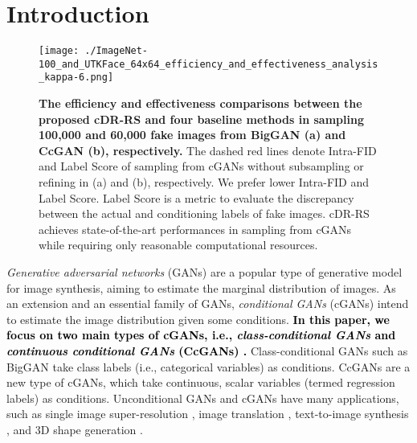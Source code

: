 \documentclass[final,12pt, 3p,times]{elsarticle}
\def\rev#1{\textcolor{black}{#1}}
\begin{document}
\section{Introduction}\label{sec:intro}

\begin{figure}[ht]
	\centering
	\texttt{[image: ./ImageNet-100\_and\_UTKFace\_64x64\_efficiency\_and\_effectiveness\_analysis\_kappa-6.png]}
	\caption{\textbf{The efficiency and effectiveness comparisons between the proposed cDR-RS and four baseline methods in sampling 100,000 and 60,000 fake images from BigGAN \cite{brock2018large} (a) and CcGAN \cite{ding2021ccgan, ding2020continuous} (b), respectively.} The dashed red lines denote Intra-FID \cite{miyato2018cgans} and Label Score \cite{ding2021ccgan, ding2020continuous} of sampling from cGANs without subsampling or refining in (a) and (b), respectively. We prefer lower Intra-FID and Label Score. Label Score is a metric to evaluate the discrepancy between the actual and conditioning labels of fake images. cDR-RS achieves state-of-the-art performances in sampling from cGANs while requiring only reasonable computational resources.}
	\label{fig:cover_fig}
\end{figure}



\textit{Generative adversarial networks} (GANs) \cite{goodfellow2014generative, li2021theoretical,chen2020adversarial,faezi2021degan} are a popular type of generative model for image synthesis, aiming to estimate the marginal distribution of images. As an extension and an essential family of GANs, \textit{conditional GANs} (cGANs) \cite{mirza2014conditional} intend to estimate the image distribution given some conditions. \rev{\textbf{In this paper, we focus on two main types of cGANs, i.e., \textit{class-conditional GANs} \cite{odena2017conditional, miyato2018cgans, brock2018large, zhang2019self, ali2019mfc,xu2021conditional} and \textit{continuous conditional GANs} (CcGANs) \cite{ding2021ccgan, ding2020continuous}.}} Class-conditional GANs such as BigGAN \cite{brock2018large} take class labels (i.e., categorical variables) as conditions. CcGANs \cite{ding2021ccgan, ding2020continuous} are a new type of cGANs, which take continuous, scalar variables (termed regression labels) as conditions. Unconditional GANs and cGANs have many applications, such as single image super-resolution \cite{ledig2017photo,dharejo2021twist}, image translation \cite{isola2017image, lai2021unsupervised, romero2019smit}, text-to-image synthesis \cite{ruan2021dae,zhou2021survey}, and 3D shape generation \cite{nobari2022range, triess2022point}.  
\end{document}
